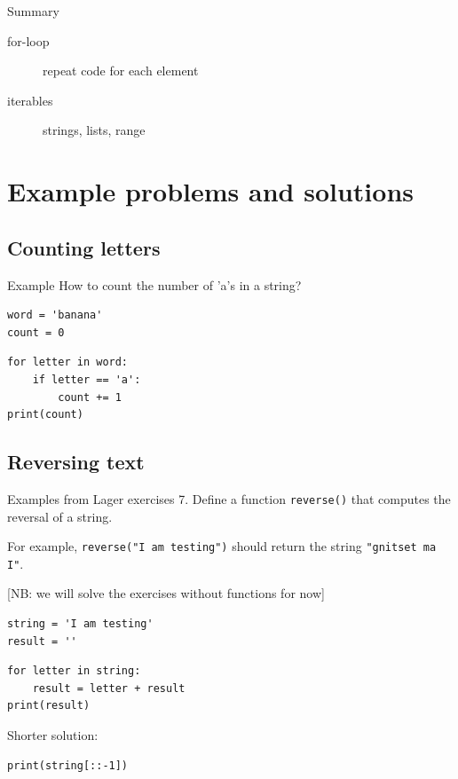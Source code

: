 \documentclass[aspectratio=169,usenames,dvipsnames]{beamer}
\begin{document}
\begin{frame}{Summary}
    \begin{description}
        \item[for-loop] repeat code for each element
        \item[iterables] strings, lists, range
    \end{description}
\end{frame}

\section{Example problems and solutions}
\subsection{Counting letters}
\begin{frame}[fragile]{Example}
How to count the number of 'a's in a string?
\begin{lstlisting}
word = 'banana'
count = 0
\end{lstlisting}
\pause
\begin{lstlisting}
for letter in word:
    if letter == 'a':
        count += 1
print(count)
\end{lstlisting}
\end{frame}


\subsection{Reversing text}
\begin{frame}[fragile]{Examples from Lager exercises}
7. Define a function \texttt{reverse()} that computes the reversal of a string.

   \vspace{1em}
   For example, \texttt{reverse("I am testing")} should return the string
   \texttt{"gnitset ma I"}.

[NB: we will solve the exercises without functions for now]

\begin{lstlisting}
string = 'I am testing'
result = ''
\end{lstlisting}
\pause
\begin{lstlisting}
for letter in string:
    result = letter + result
print(result)
\end{lstlisting}

\pause
Shorter solution:
\begin{lstlisting}
print(string[::-1])
\end{lstlisting}
\end{frame}
\end{document}
